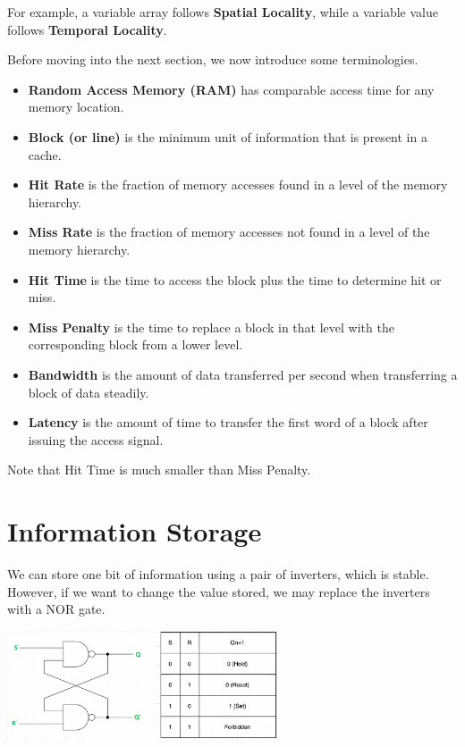 For example, a variable array follows \textbf{Spatial Locality}, while a variable value follows \textbf{Temporal Locality}.

Before moving into the next section, we now introduce some terminologies.

\begin{itemize}
  \item \textbf{Random Access Memory (RAM)} has comparable access time for any memory location.
  \item \textbf{Block (or line)} is the minimum unit of information that is present in a cache.
  \item \textbf{Hit Rate} is the fraction of memory accesses found in a level of the memory hierarchy.
  \item \textbf{Miss Rate} is the fraction of memory accesses not found in a level of the memory hierarchy.
  \item \textbf{Hit Time} is the time to access the block plus the time to determine hit or miss.
  \item \textbf{Miss Penalty} is the time to replace a block in that level with the corresponding block from a lower level.
  \item \textbf{Bandwidth} is the amount of data transferred per second when transferring a block of data steadily.
  \item \textbf{Latency} is the amount of time to transfer the first word of a block after issuing the access signal.
\end{itemize}

\begin{remark}
  Note that Hit Time is much smaller than Miss Penalty.
\end{remark}

\section{Information Storage}
We can store one bit of information using a pair of inverters, which is stable. However, if we want to change the value stored, we may replace the inverters with a NOR gate.
\begin{center}
  \includegraphics[width=0.6\textwidth]{Figure/SR_latch.png}
\end{center}

